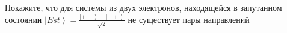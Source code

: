 \documentclass[__main__.tex]{subfiles}
\begin{document}
Покажите, что для системы из двух электронов, находящейся в запутанном состоянии $\left|Est\right>=\frac{\left|+-\right>-\left|-+\right>}{\sqrt{2}}$ не существует пары направлений\\ 

\end{document}
